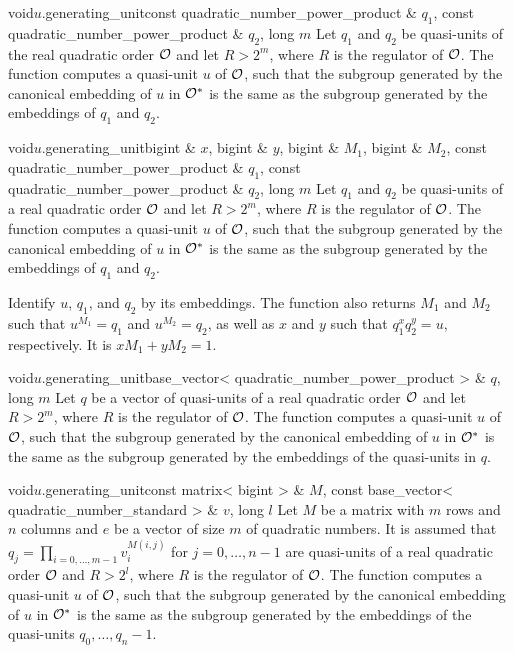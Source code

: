 \begin{fcode}{void}{$u$.generating_unit}{const quadratic_number_power_product & $q_1$,
    const quadratic_number_power_product & $q_2$, long $m$}%
  Let $q_1$ and $q_2$ be quasi-units of the real quadratic order $\mathcal{O}$ and let $R > 2^m$, where
  $R$ is the regulator of $\mathcal{O}$.  The function computes a quasi-unit $u$ of $\mathcal{O}$, such that the
  subgroup generated by the canonical embedding of $u$ in $\mathcal{O}^*$ is the same as the subgroup
  generated by the embeddings of $q_1$ and $q_2$.
\end{fcode}

\begin{fcode}{void}{$u$.generating_unit}{bigint & $x$, bigint & $y$,
    bigint & $M_1$, bigint & $M_2$, const quadratic_number_power_product & $q_1$,
    const quadratic_number_power_product & $q_2$, long $m$}%
  Let $q_1$ and $q_2$ be quasi-units of a real quadratic order $\mathcal{O}$ and let $R > 2^m$, where
  $R$ is the regulator of $\mathcal{O}$.  The function computes a quasi-unit $u$ of $\mathcal{O}$, such that the
  subgroup generated by the canonical embedding of $u$ in $\mathcal{O}^*$ is the same as the subgroup
  generated by the embeddings of $q_1$ and $q_2$.
  
  Identify $u$, $q_1$, and $q_2$ by its embeddings.  The function also returns $M_1$ and $M_2$
  such that $u^{M_1} = q_1$ and $u^{M_2} = q_2$, as well as $x$ and $y$ such that $q_1^x q_2^y =
  u$, respectively.  It is $x M_1 + y M_2 = 1$.
\end{fcode}

\begin{fcode}{void}{$u$.generating_unit}{base_vector< quadratic_number_power_product > & $q$, long $m$}
  Let $q$ be a vector of quasi-units of a real quadratic order $\mathcal{O}$ and let $R > 2^m$, where
  $R$ is the regulator of $\mathcal{O}$.  The function computes a quasi-unit $u$ of $\mathcal{O}$, such that the
  subgroup generated by the canonical embedding of $u$ in $\mathcal{O}^*$ is the same as the subgroup
  generated by the embeddings of the quasi-units in $q$.
\end{fcode}

\begin{fcode}{void}{$u$.generating_unit}{const matrix< bigint > & $M$,
    const base_vector< quadratic_number_standard > & $v$, long $l$}%
  Let $M$ be a matrix with $m$ rows and $n$ columns and $e$ be a vector of size $m$ of quadratic
  numbers.  It is assumed that $q_j = \prod_{i=0,\dots,m-1} v_i^{M(i,j)}$ for $j = 0,\dots,n-1$
  are quasi-units of a real quadratic order $\mathcal{O}$ and $R > 2^l$, where $R$ is the regulator of
  $\mathcal{O}$.  The function computes a quasi-unit $u$ of $\mathcal{O}$, such that the subgroup generated by
  the canonical embedding of $u$ in $\mathcal{O}^*$ is the same as the subgroup generated by the
  embeddings of the quasi-units $q_0,\dots,q_n-1$.
\end{fcode}


